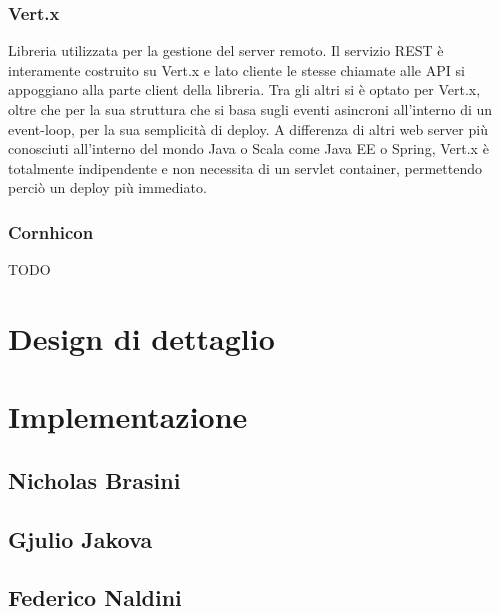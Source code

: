 	 \subsubsection{Vert.x}\label{subsub:tecnologie:vert.x}
	  Libreria utilizzata per la gestione del server remoto. Il servizio REST è interamente costruito su Vert.x e lato cliente le stesse chiamate alle API si appoggiano alla parte client della libreria.
	  Tra gli altri si è optato per Vert.x, oltre che per la sua struttura che si basa sugli eventi asincroni all'interno di un event-loop, per la sua semplicità di deploy. A differenza di altri web server più conosciuti all'interno del mondo Java o Scala come Java EE o Spring, Vert.x è totalmente
	  indipendente e non necessita di un servlet container, permettendo perciò un deploy più immediato.
        \clearpage
        
	 \subsubsection{Cornhicon} 
	  TODO
    \section{Design di dettaglio}\label{sec:design:details}
    
    \clearpage
    
    \section{Implementazione}\label{sec:implementation}
        \subsection{Nicholas Brasini}\label{subsec:brasini}
        \subsection{Gjulio Jakova}\label{subsec:jakova}
        \subsection{Federico Naldini}\label{subsec:naldini}
